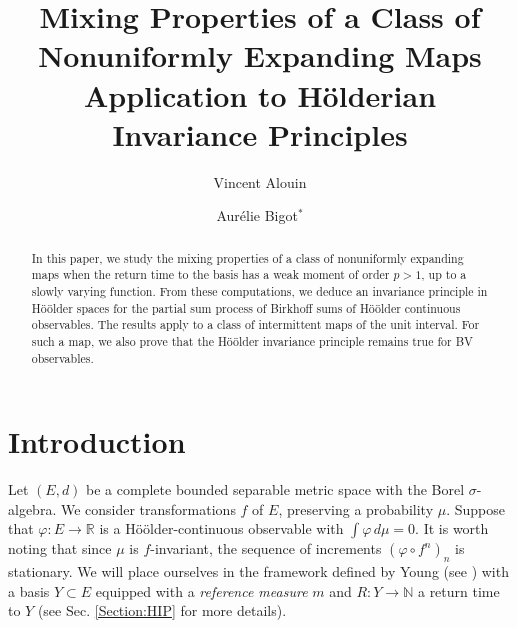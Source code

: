 \documentclass{ws-sd}
\title{Mixing Properties of a Class of Nonuniformly Expanding Maps Application to H\"olderian Invariance Principles}
\date{ }
\author{Vincent Alouin}
\author{Aur\'elie Bigot$^{\ast}$}
\newcommand{\R}{\mathbb{R}}
\begin{document}
\maketitle

{\let\thefootnote\relax{}}

\begin{history}
\end{history}

\begin{abstract}
    In this paper, we study the mixing properties of a class of nonuniformly expanding maps when the return time to the basis has a weak moment of order $p>1$, up to a slowly varying function. From these computations, we deduce an invariance principle in Hö\"older spaces for the partial sum process of Birkhoff sums of H\"oölder continuous observables. The results apply to a class of intermittent maps of the unit interval. For such a map, we also prove that the H\"oölder invariance principle remains true for BV observables.
\end{abstract}


\section{Introduction}
    \label{Section:intro}
    
Let $(E, d)$ be a complete bounded separable metric space with the Borel $\sigma$-algebra. We consider transformations $f$ of $E$, preserving a probability $\mu$. Suppose that $\varphi : E \to \R$ is a Hö\"older-continuous observable with $\int \varphi \, d\mu = 0$. It is worth noting that since $\mu$ is $f$-invariant, the sequence of increments $(\varphi \circ f^n)_n$ is stationary. We will place ourselves in the framework defined by Young (see \cite{27}) with  a basis $Y \subset E$ equipped with a \textit{reference measure} $m$ and $R : Y \to \mathbb N$ a return time to $Y$ (see Sec. \ref{Section:HIP} for more details).
\\
\end{document}
